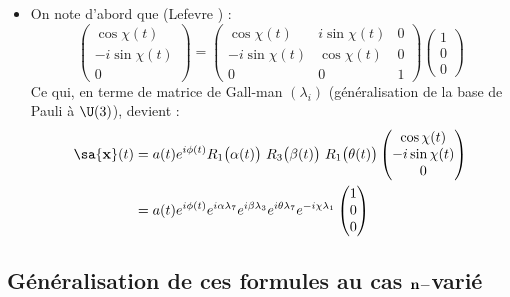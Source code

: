 \begin{itemize}
	\item On note d'abord que (Lefevre \cite{lefevre_polarization_2021}) :
	\[\begin{pmatrix}
		\cos\chi(t) \\ -i\sin\chi(t) \\ 0
	\end{pmatrix} = \begin{pmatrix}
		\cos\chi(t) & i\sin\chi(t) & 0 \\ -i\sin\chi(t) & \cos\chi(t) & 0 \\ 0 & 0 & 1
	\end{pmatrix}\begin{pmatrix}
	1 \\ 0 \\ 0
	\end{pmatrix}\]
	Ce qui, en terme de matrice de Gall-man $(\lambda_i)$ (généralisation de la base de Pauli à $\U(3)$), devient :
	\begin{align*}
		\sa{\bf{x}}(t) &= a(t)e^{i\phi(t)} R_1\big(\alpha(t)\big)\ R_3\big(\beta(t)\big)\ R_1\big(\theta(t)\big)\begin{pmatrix}
			\cos\chi(t) \\ -i\sin\chi(t) \\ 0
		\end{pmatrix} \\
		&= a(t)e^{i\phi(t)} e^{i\alpha \lambda_7} e^{i\beta \lambda_3} e^{i\theta \lambda_7} e^{-i\chi \lambda_1}\begin{pmatrix}
			1 \\ 0 \\ 0
		\end{pmatrix}
	\end{align*}
	
	
\end{itemize}





\subsection{Généralisation de ces formules au cas $\bf{n-}$varié}

